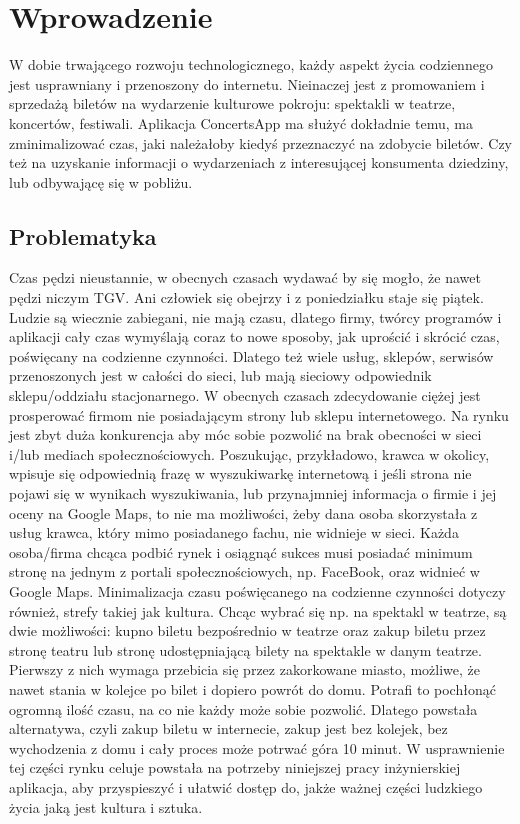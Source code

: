 \documentclass[12pt]{article}
\begin{document}
\begin{sloppypar}


\tableofcontents
\newpage

\section{Wprowadzenie}
{
  W dobie trwającego rozwoju technologicznego, każdy aspekt życia codziennego jest usprawniany i przenoszony
  do internetu. Nieinaczej jest z promowaniem i sprzedażą biletów na wydarzenie kulturowe pokroju:
  spektakli w teatrze, koncertów, festiwali. Aplikacja ConcertsApp ma służyć dokładnie temu,
  ma zminimalizować czas, jaki należałoby kiedyś przeznaczyć na zdobycie biletów. Czy też na uzyskanie
  informacji o wydarzeniach z interesującej konsumenta dziedziny, lub odbywającę się w pobliżu.
  \subsection{Problematyka}
  {
    Czas pędzi nieustannie, w obecnych czasach wydawać by się mogło, że nawet pędzi niczym TGV. Ani człowiek się obejrzy i z poniedziałku staje się piątek. 
    Ludzie są wiecznie zabiegani, nie mają czasu, dlatego firmy, twórcy programów i aplikacji cały czas wymyślają coraz to nowe sposoby, jak uprościć i 
    skrócić czas, poświęcany na codzienne czynności.
    Dlatego też wiele usług, sklepów, serwisów przenoszonych jest w całości do sieci, lub mają sieciowy odpowiednik sklepu/oddziału stacjonarnego. 
    W obecnych czasach zdecydowanie ciężej jest prosperować firmom nie posiadającym strony lub sklepu internetowego. 
    Na rynku jest zbyt duża konkurencja aby móc sobie pozwolić na brak obecności w sieci i/lub mediach społecznościowych. 
    Poszukując, przykładowo, krawca w okolicy, wpisuje się odpowiednią frazę w wyszukiwarkę internetową i jeśli strona nie pojawi się w wynikach wyszukiwania, lub 
    przynajmniej informacja o firmie i jej oceny na Google Maps, to nie ma możliwości, 
    żeby dana osoba skorzystała z usług krawca, który mimo posiadanego fachu, nie widnieje w sieci. 
    Każda osoba/firma chcąca podbić rynek i osiągnąć sukces musi posiadać minimum stronę na jednym z portali społecznościowych, np. FaceBook, oraz widnieć w Google Maps. 
    Minimalizacja czasu poświęcanego na codzienne czynności dotyczy również, strefy takiej jak kultura. 
    Chcąc wybrać się np. na spektakl w teatrze, są dwie możliwości: kupno biletu bezpośrednio w teatrze oraz zakup biletu przez stronę teatru lub stronę udostępniającą bilety na spektakle w danym teatrze.
    Pierwszy z nich wymaga przebicia się przez zakorkowane miasto, możliwe, że nawet stania w kolejce po bilet i dopiero powrót do domu. 
    Potrafi to pochłonąć ogromną ilość czasu, na co nie każdy może sobie pozwolić. 
    Dlatego powstała alternatywa, czyli zakup biletu w internecie, zakup jest bez kolejek, bez wychodzenia z domu i cały proces może potrwać góra 10 minut. 
    W usprawnienie tej części rynku celuje powstała na potrzeby niniejszej pracy inżynierskiej aplikacja, aby przyspieszyć i ułatwić dostęp do, jakże ważnej części ludzkiego życia jaką jest kultura i sztuka. 
  }
}
\end{sloppypar}
\end{document}
